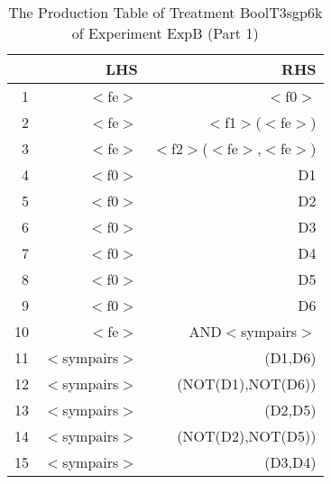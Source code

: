 \begin{table}[ht]
\centering
\begin{tabular}{rrr}
  \hline
 & LHS & RHS \\ 
  \hline
1 & $<$fe$>$ & $<$f0$>$ \\ 
  2 & $<$fe$>$ & $<$f1$>$($<$fe$>$) \\ 
  3 & $<$fe$>$ & $<$f2$>$($<$fe$>$,$<$fe$>$) \\ 
  4 & $<$f0$>$ & D1 \\ 
  5 & $<$f0$>$ & D2 \\ 
  6 & $<$f0$>$ & D3 \\ 
  7 & $<$f0$>$ & D4 \\ 
  8 & $<$f0$>$ & D5 \\ 
  9 & $<$f0$>$ & D6 \\ 
  10 & $<$fe$>$ & AND$<$sympairs$>$ \\ 
  11 & $<$sympairs$>$ & (D1,D6) \\ 
  12 & $<$sympairs$>$ & (NOT(D1),NOT(D6)) \\ 
  13 & $<$sympairs$>$ & (D2,D5) \\ 
  14 & $<$sympairs$>$ & (NOT(D2),NOT(D5)) \\ 
  15 & $<$sympairs$>$ & (D3,D4) \\ 
   \hline
\end{tabular}
\caption{The Production Table of Treatment BoolT3sgp6k of Experiment ExpB (Part 1)} 
\end{table}
